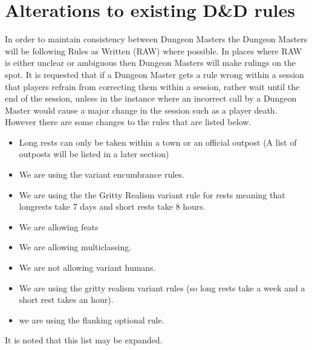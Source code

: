 \chapter{Alterations to existing D\&D rules}
In order to maintain consistency between Dungeon Masters the Dungeon Masters will be following Rules as Written (RAW) where possible. In places where RAW is either unclear or ambiguous then Dungeon Masters will make rulings on the spot. It is requested that if a Dungeon Master gets a rule wrong within a session that players refrain from correcting them within a session, rather wait until the end of the session, unless in the instance where an incorrect call by a Dungeon Master would cause a major change in the session such as a player death. \newline
However there are some changes to the rules that are listed below.
\begin{itemize}
  \item Long rests can only be taken within a town or an official outpost (A list of outposts will be listed in a later section)
  \item We are using the variant encumbrance rules.
  \item We are using the the Gritty Realism variant rule for rests meaning that longrests take 7 days and short rests take 8 hours.
  \item We are allowing feats
  \item We are allowing multiclassing.
  \item We are not allowing variant humans.
  \item We are using the gritty realism variant rules (so long rests take a week and a short rest takes an hour).
  \item we are using the flanking optional rule. 
\end{itemize}
It is noted that this list may be expanded.